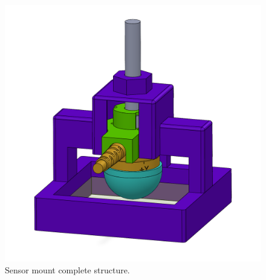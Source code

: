 \begin{figure}[H]
    \centering
    \includegraphics[width = 0.7\linewidth]{Chapters/Chapter5/Exp_Evaluation/Figures/ATI_test_platform.png}
    \caption{Sensor mount complete structure.}
    \label{fig: Sensor_mount_complete}
\end{figure}

